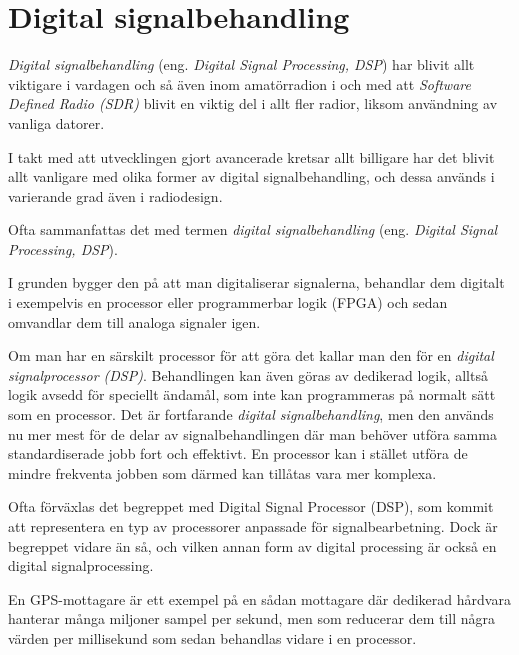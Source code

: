 \newpage
{}
\section{Digital signalbehandling}
\label{sec:DSP}

\emph{Digital signalbehandling} (eng. \emph{Digital Signal Processing, DSP})
har blivit allt viktigare i vardagen och så även inom amatörradion i och med
att \emph{Software Defined Radio (SDR)} blivit en viktig del i allt fler
radior, liksom användning av vanliga datorer.

I takt med att utvecklingen gjort avancerade kretsar allt billigare har det
blivit allt vanligare med olika former av digital signalbehandling, och dessa
används i varierande grad även i radiodesign.

Ofta sammanfattas det med termen \emph{digital signalbehandling} (eng.
\emph{Digital Signal Processing, DSP}).

I grunden bygger den på att man digitaliserar signalerna, behandlar dem
digitalt i exempelvis en processor eller programmerbar logik (FPGA) och sedan
omvandlar dem till analoga signaler igen.

Om man har en särskilt processor för att göra det kallar man den för en
\emph{digital signalprocessor (DSP)}.
Behandlingen kan även göras av dedikerad logik, alltså logik avsedd för speciellt
ändamål, som inte kan programmeras på normalt sätt som en processor.
Det är fortfarande \emph{digital signalbehandling}, men den används nu mer mest
för de delar av signalbehandlingen där man behöver utföra samma standardiserade
jobb fort och effektivt.
En processor kan i stället utföra de mindre frekventa jobben som därmed kan
tillåtas vara mer komplexa.

Ofta förväxlas det begreppet med Digital Signal Processor (DSP), som kommit att
representera en typ av processorer anpassade för signalbearbetning.
Dock är begreppet vidare än så, och vilken annan form av digital processing är
också en digital signalprocessing.

En GPS-mottagare är ett exempel på en sådan mottagare där dedikerad hårdvara
hanterar många miljoner sampel per sekund, men som reducerar dem till några värden
per millisekund som sedan behandlas vidare i en processor.

